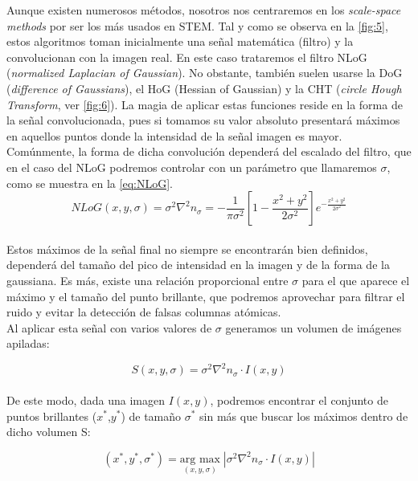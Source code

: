 Aunque existen numerosos métodos, nosotros nos centraremos en los \textit{scale-space methods} por ser los más usados en STEM. Tal y como se observa en la \autoref{fig:5}, estos algoritmos toman inicialmente una señal matemática (filtro) y la convolucionan con la imagen real. En este caso trataremos el filtro NLoG (\textit{normalized Laplacian of Gaussian}). No obstante, también suelen usarse la DoG (\textit{difference of Gaussians}), el HoG (Hessian of Gaussian) y la CHT (\textit{circle Hough Transform}, ver \autoref{fig:6}). La magia de aplicar estas funciones reside en la forma de la señal convolucionada, pues si tomamos su valor absoluto presentará máximos en aquellos puntos donde la intensidad de la señal imagen es mayor. Comúnmente, la forma de dicha convolución dependerá del escalado del filtro, que en el caso del NLoG podremos controlar con un parámetro que llamaremos $\sigma$, como se muestra en la \autoref{eq:NLoG}.\\

\begin{equation} \label{eq:NLoG}
    NLoG(x,y,\sigma) = \sigma^2\nabla^2 n_\sigma =  - \frac{1}{\pi\sigma^2}\left[1 - \frac{x^2 + y^2}{2\sigma^2}\right]e^{-\frac{x^2 + y^2}{2\sigma^2}}
\end{equation}\\

Estos máximos de la señal final no siempre se encontrarán bien definidos, dependerá del tamaño del pico de intensidad en la imagen y de la forma de la gaussiana. Es más, existe una relación proporcional entre $\sigma$ para el que aparece el máximo y el tamaño del punto brillante, que podremos aprovechar para filtrar el ruido y evitar la detección de falsas columnas atómicas.\\

Al aplicar esta señal con varios valores de $\sigma$ generamos un volumen de imágenes apiladas:

\begin{equation}
    S(x,y,\sigma) = \sigma^2\nabla^2 n_\sigma \cdot I(x,y)
\end{equation}\\

De este modo, dada una imagen $I(x,y)$, podremos encontrar el conjunto de puntos brillantes ($x^*$,$y^*$) de tamaño $\sigma^*$ sin más que buscar los máximos dentro de dicho volumen S:

\begin{equation}
    (x^*,y^*,\sigma^*) = \underset{(x,y,\sigma)}{\text{arg max}} \; |\sigma^2 \nabla^2 n_\sigma \cdot I(x,y)|
\end{equation}\\

